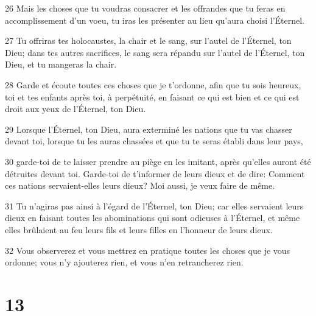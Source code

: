 \par 26 Mais les choses que tu voudras consacrer et les offrandes que tu feras en accomplissement d'un voeu, tu iras les présenter au lieu qu'aura choisi l'Éternel.
\par 27 Tu offriras tes holocaustes, la chair et le sang, sur l'autel de l'Éternel, ton Dieu; dans tes autres sacrifices, le sang sera répandu sur l'autel de l'Éternel, ton Dieu, et tu mangeras la chair.
\par 28 Garde et écoute toutes ces choses que je t'ordonne, afin que tu sois heureux, toi et tes enfants après toi, à perpétuité, en faisant ce qui est bien et ce qui est droit aux yeux de l'Éternel, ton Dieu.
\par 29 Lorsque l'Éternel, ton Dieu, aura exterminé les nations que tu vas chasser devant toi, lorsque tu les auras chassées et que tu te seras établi dans leur pays,
\par 30 garde-toi de te laisser prendre au piège en les imitant, après qu'elles auront été détruites devant toi. Garde-toi de t'informer de leurs dieux et de dire: Comment ces nations servaient-elles leurs dieux? Moi aussi, je veux faire de même.
\par 31 Tu n'agiras pas ainsi à l'égard de l'Éternel, ton Dieu; car elles servaient leurs dieux en faisant toutes les abominations qui sont odieuses à l'Éternel, et même elles brûlaient au feu leurs fils et leurs filles en l'honneur de leurs dieux.
\par 32 Vous observerez et vous mettrez en pratique toutes les choses que je vous ordonne; vous n'y ajouterez rien, et vous n'en retrancherez rien.

\chapter{13}

